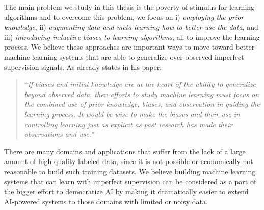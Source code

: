 \medskip

The main problem we study in this thesis is the poverty of stimulus for learning algorithms and to overcome this problem, we focus on  i) \emph{employing the prior knowledge}, ii) \emph{augmenting data and meta-learning how to better use the data}, and iii) \emph{introducing inductive biases to learning algorithms}, all to improve the learning process. We believe these approaches are important ways to move toward better machine learning systems that are able to generalize over observed imperfect supervision signals. As \citet{Mitchell80theneed} already states in his paper:
\begin{quote}
``\emph{If biases and initial knowledge are at the heart of the ability to generalize beyond observed data, then efforts to study machine learning must focus on the combined use of prior knowledge, biases, and observation in guiding the learning process. It would be wise to make the biases and their use in controlling learning just as explicit as past research has made their observations and use.}''
\end{quote}

There are many domains and applications that suffer from the lack of a large amount of high quality labeled data, since it is not possible or economically not reasonable to build such training datasets. We believe building machine learning systems that can learn with imperfect supervision can be considered as a part of the bigger effort to democratize AI by making it dramatically easier to extend AI-powered systems to those domains with limited or noisy data.


